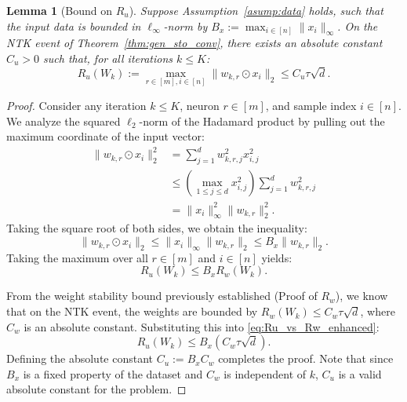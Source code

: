 \documentclass[10pt]{article} %
\newtheorem{lemma}[theorem]{Lemma}
\theoremstyle{definition}
\theoremstyle{plain}
\begin{document}
\begin{lemma}[Bound on $R_u$]
\label{lem:Ru_bound}
Suppose Assumption~\ref{asump:data} holds, such that the input data is bounded in $\ell_\infty$-norm by $B_x := \max_{i\in[n]}\|x_i\|_\infty$. On the NTK event of Theorem~\ref{thm:gen_sto_conv}, there exists an absolute constant $C_u > 0$ such that, for all iterations $k \le K$:
\begin{equation}
    R_{u}(W_k) := \max_{r \in [m], i \in [n]} \|w_{k,r} \odot x_i\|_2 \le C_u \tau \sqrt{d}.
\end{equation}
\end{lemma}

\begin{proof}
Consider any iteration $k \le K$, neuron $r \in [m]$, and sample index $i \in [n]$. We analyze the squared $\ell_2$-norm of the Hadamard product by pulling out the maximum coordinate of the input vector:
\begin{align*}
    \|w_{k,r} \odot x_i\|_2^2 &= \sum_{j=1}^d w_{k,r,j}^2 x_{i,j}^2 \\
    &\le \left( \max_{1 \le j \le d} x_{i,j}^2 \right) \sum_{j=1}^d w_{k,r,j}^2 \\
    &= \|x_i\|_\infty^2 \|w_{k,r}\|_2^2.
\end{align*}
Taking the square root of both sides, we obtain the inequality:
\[ \|w_{k,r} \odot x_i\|_2 \le \|x_i\|_\infty \|w_{k,r}\|_2 \le B_x \|w_{k,r}\|_2. \]
Taking the maximum over all $r \in [m]$ and $i \in [n]$ yields:
\begin{equation}
    \label{eq:Ru_vs_Rw_enhanced}
    R_u(W_k) \le B_x R_w(W_k).
\end{equation}

From the weight stability bound previously established (Proof of $R_w$), we know that on the NTK event, the weights are bounded by $R_w(W_k) \le C_w \tau \sqrt{d}$, where $C_w$ is an absolute constant. Substituting this into \eqref{eq:Ru_vs_Rw_enhanced}:
\[ R_u(W_k) \le B_x (C_w \tau \sqrt{d}). \]
Defining the absolute constant $C_u := B_x C_w$ completes the proof. Note that since $B_x$ is a fixed property of the dataset and $C_w$ is independent of $k$, $C_u$ is a valid absolute constant for the problem.
\end{proof}
\end{document}
